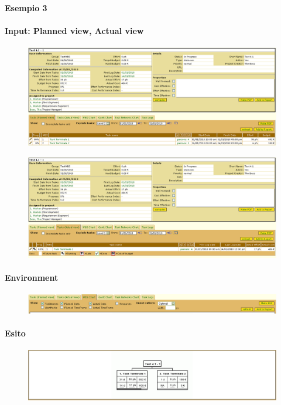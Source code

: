 \paragraph{Esempio 3}
\paragraph{Input: Planned view, Actual view}
\begin{figure}[h!]
\centering
\includegraphics[width=\textwidth]{tests/TEST_WBS/4.1/4.1_1/Esempio_3/input.png}
\end{figure}
\begin{figure}[h!]
\centering
\includegraphics[width=\textwidth]{tests/TEST_WBS/4.1/4.1_1/Esempio_3/input_actual.png}
\end{figure}
\newpage

\paragraph{Environment}
\begin{figure}[h!]
\centering
\includegraphics[width=\textwidth]{tests/TEST_WBS/4.1/4.1_1/Esempio_3/environment.png}
\end{figure}

\paragraph{Esito}
\begin{figure}[h!]
\centering
\includegraphics[width=\textwidth]{tests/TEST_WBS/4.1/4.1_1/Esempio_3/output.png}
\end{figure}
\newpage


